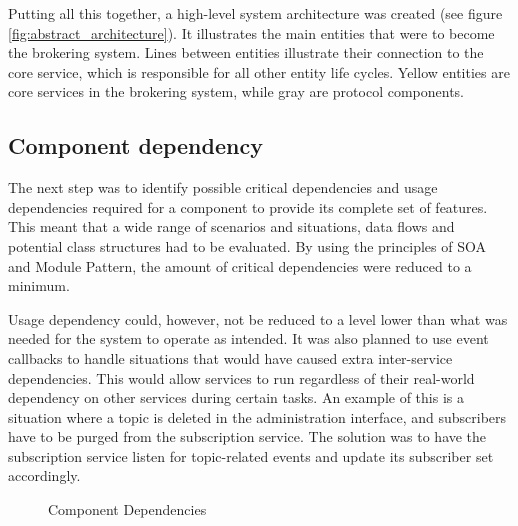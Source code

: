 Putting all this together, a high-level system architecture was created (see figure \ref{fig:abstract_architecture}). It illustrates the main entities that were to become the brokering system. Lines between entities illustrate their connection to the core service, which is responsible for all other entity life cycles. Yellow entities are core services in the brokering system, while gray are protocol components.

\subsection{Component dependency}
\label{subsec:architecture_and_implementation-broker_architecture-component_dependency}

The next step was to identify possible critical dependencies and usage dependencies required for a component to provide its complete set of features. This meant that a wide range of scenarios and situations, data flows and potential class structures had to be evaluated. By using the principles of SOA and Module Pattern, the amount of critical dependencies were reduced to a minimum.

Usage dependency could, however, not be reduced to a level lower than what was needed for the system to operate as intended. It was also planned to use event callbacks to handle situations that would have caused extra inter-service dependencies. This would allow services to run regardless of their real-world dependency on other services during certain tasks. An example of this is a situation where a topic is deleted in the administration interface, and subscribers have to be purged from the subscription service. The solution was to have the subscription service listen for topic-related events and update its subscriber set accordingly.

\begin{center}
  \begin{figure}[ht!]
    \caption{Component Dependencies}
    \label{fig:architecture_dependency}
  \end{figure}
\end{center}

